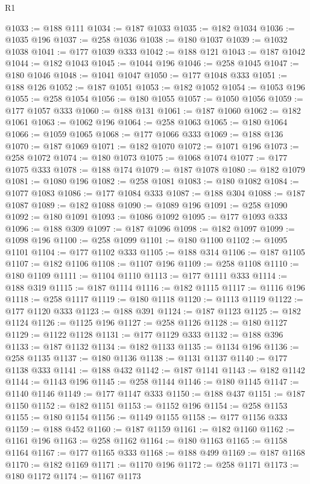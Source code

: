 \begin{lexlean}{R1}
\begin{coremodule}
@1033 := @188 @111
@1034 := @187 @1033
@1035 := @182 @1034
@1036 := @1035 @196
@1037 := @258 @1036
@1038 := @180 @1037
@1039 := @1032 @1038
@1041 := @177 @1039 @333
@1042 := @188 @121
@1043 := @187 @1042
@1044 := @182 @1043
@1045 := @1044 @196
@1046 := @258 @1045
@1047 := @180 @1046
@1048 := @1041 @1047
@1050 := @177 @1048 @333
@1051 := @188 @126
@1052 := @187 @1051
@1053 := @182 @1052
@1054 := @1053 @196
@1055 := @258 @1054
@1056 := @180 @1055
@1057 := @1050 @1056
@1059 := @177 @1057 @333
@1060 := @188 @131
@1061 := @187 @1060
@1062 := @182 @1061
@1063 := @1062 @196
@1064 := @258 @1063
@1065 := @180 @1064
@1066 := @1059 @1065
@1068 := @177 @1066 @333
@1069 := @188 @136
@1070 := @187 @1069
@1071 := @182 @1070
@1072 := @1071 @196
@1073 := @258 @1072
@1074 := @180 @1073
@1075 := @1068 @1074
@1077 := @177 @1075 @333
@1078 := @188 @174
@1079 := @187 @1078
@1080 := @182 @1079
@1081 := @1080 @196
@1082 := @258 @1081
@1083 := @180 @1082
@1084 := @1077 @1083
@1086 := @177 @1084 @333
@1087 := @188 @304
@1088 := @187 @1087
@1089 := @182 @1088
@1090 := @1089 @196
@1091 := @258 @1090
@1092 := @180 @1091
@1093 := @1086 @1092
@1095 := @177 @1093 @333
@1096 := @188 @309
@1097 := @187 @1096
@1098 := @182 @1097
@1099 := @1098 @196
@1100 := @258 @1099
@1101 := @180 @1100
@1102 := @1095 @1101
@1104 := @177 @1102 @333
@1105 := @188 @314
@1106 := @187 @1105
@1107 := @182 @1106
@1108 := @1107 @196
@1109 := @258 @1108
@1110 := @180 @1109
@1111 := @1104 @1110
@1113 := @177 @1111 @333
@1114 := @188 @319
@1115 := @187 @1114
@1116 := @182 @1115
@1117 := @1116 @196
@1118 := @258 @1117
@1119 := @180 @1118
@1120 := @1113 @1119
@1122 := @177 @1120 @333
@1123 := @188 @391
@1124 := @187 @1123
@1125 := @182 @1124
@1126 := @1125 @196
@1127 := @258 @1126
@1128 := @180 @1127
@1129 := @1122 @1128
@1131 := @177 @1129 @333
@1132 := @188 @396
@1133 := @187 @1132
@1134 := @182 @1133
@1135 := @1134 @196
@1136 := @258 @1135
@1137 := @180 @1136
@1138 := @1131 @1137
@1140 := @177 @1138 @333
@1141 := @188 @432
@1142 := @187 @1141
@1143 := @182 @1142
@1144 := @1143 @196
@1145 := @258 @1144
@1146 := @180 @1145
@1147 := @1140 @1146
@1149 := @177 @1147 @333
@1150 := @188 @437
@1151 := @187 @1150
@1152 := @182 @1151
@1153 := @1152 @196
@1154 := @258 @1153
@1155 := @180 @1154
@1156 := @1149 @1155
@1158 := @177 @1156 @333
@1159 := @188 @452
@1160 := @187 @1159
@1161 := @182 @1160
@1162 := @1161 @196
@1163 := @258 @1162
@1164 := @180 @1163
@1165 := @1158 @1164
@1167 := @177 @1165 @333
@1168 := @188 @499
@1169 := @187 @1168
@1170 := @182 @1169
@1171 := @1170 @196
@1172 := @258 @1171
@1173 := @180 @1172
@1174 := @1167 @1173

\end{coremodule}
\end{lexlean}

